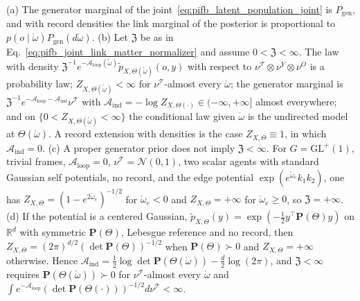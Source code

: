 \begin{proposition}\label{prop:llp_induced}
(a) The generator marginal of the joint~\eqref{eq:pifb_latent_population_joint} is $P_{\mathrm{gen}}$, and with record densities the link marginal of the posterior is proportional to $p(o\mid\mathring\omega)P_{\mathrm{gen}}(d\mathring\omega)$.
(b) Let $\mathfrak Z$ be as in Eq.~\eqref{eq:pifb_joint_link_matter_normalizer} and assume $0<\mathfrak Z<\infty$. The law with density $\mathfrak Z^{-1}e^{-\mathcal A_{\mathrm{loop}}(\mathring\omega)}\widetilde p_{X,\Theta(\mathring\omega)}(o,y)$ with respect to $\nu^{\mathcal T}\otimes\nu^Y\otimes\nu^O$ is a probability law; $Z_{X,\Theta(\mathring\omega)}<\infty$ for $\nu^{\mathcal T}$-almost every $\mathring\omega$; the generator marginal is $\mathfrak Z^{-1}e^{-\mathcal A_{\mathrm{loop}}-\mathcal A_{\mathrm{ind}}}\nu^{\mathcal T}$ with $\mathcal A_{\mathrm{ind}}=-\log Z_{X,\Theta(\cdot)}\in(-\infty,+\infty]$ almost everywhere; and on $\{0<Z_{X,\Theta(\mathring\omega)}<\infty\}$ the conditional law given $\mathring\omega$ is the undirected model at $\Theta(\mathring\omega)$. A record extension with densities is the case $Z_{X,\Theta}\equiv1$, in which $\mathcal A_{\mathrm{ind}}=0$.
(c) A proper generator prior does not imply $\mathfrak Z<\infty$. For $G=\mathrm{GL}^+(1)$, trivial frames, $\mathcal A_{\mathrm{loop}}=0$, $\nu^{\mathcal T}=\mathcal N(0,1)$, two scalar agents with standard Gaussian self potentials, no record, and the edge potential $\exp(e^{\mathring\omega_e}k_1k_2)$, one has $Z_{X,\Theta}=(1-e^{2\mathring\omega_e})^{-1/2}$ for $\mathring\omega_e<0$ and $Z_{X,\Theta}=+\infty$ for $\mathring\omega_e\geq0$, so $\mathfrak Z=+\infty$.
(d) If the potential is a centered Gaussian, $\widetilde p_{X,\Theta}(y)=\exp(-\frac12y^\top\mathbf P(\Theta)y)$ on $\mathbb R^d$ with symmetric $\mathbf P(\Theta)$, Lebesgue reference and no record, then $Z_{X,\Theta}=(2\pi)^{d/2}(\det\mathbf P(\Theta))^{-1/2}$ when $\mathbf P(\Theta)\succ0$ and $Z_{X,\Theta}=+\infty$ otherwise. Hence $\mathcal A_{\mathrm{ind}}=\frac12\log\det\mathbf P(\Theta(\mathring\omega))-\frac d2\log(2\pi)$, and $\mathfrak Z<\infty$ requires $\mathbf P(\Theta(\mathring\omega))\succ0$ for $\nu^{\mathcal T}$-almost every $\mathring\omega$ and $\int e^{-\mathcal A_{\mathrm{loop}}}(\det\mathbf P(\Theta(\cdot)))^{-1/2}d\nu^{\mathcal T}<\infty$.
\end{proposition}

